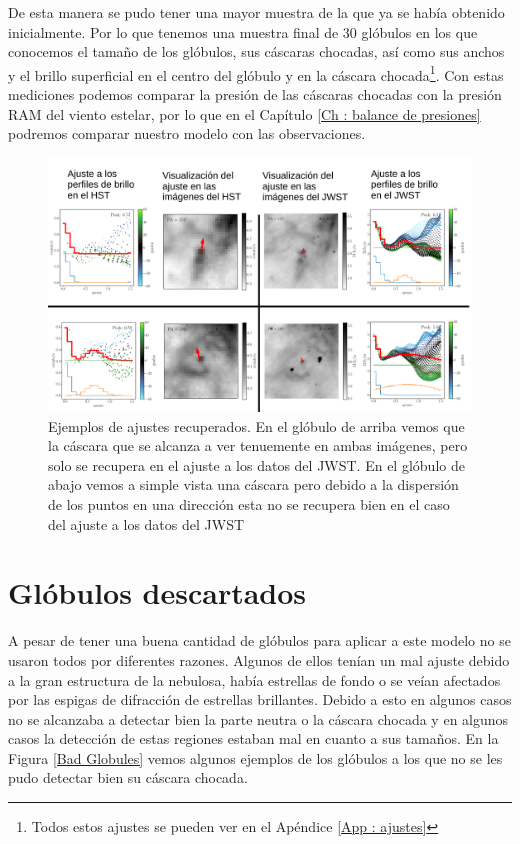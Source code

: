 \documentclass{book}
\begin{document}
De esta manera se pudo tener una mayor muestra de la que ya se había obtenido inicialmente. Por lo que tenemos una muestra final de 30 glóbulos en los que conocemos el tamaño de los glóbulos, sus cáscaras chocadas, así como  sus anchos y el brillo superficial en el centro del glóbulo y en la cáscara chocada\footnote{Todos estos ajustes se pueden ver en el Apéndice \ref{App : ajustes}}. Con estas mediciones podemos comparar la presión de las cáscaras chocadas con la presión RAM del viento estelar, por lo que en el Capítulo \ref{Ch : balance de presiones} podremos comparar nuestro modelo con las observaciones.

\begin{figure}[htb]
    \centering
    \includegraphics[width=\textwidth]{imagenes_corregidas/recuperados_aj.pdf}
    \caption{Ejemplos de ajustes recuperados. En el glóbulo de arriba vemos que la cáscara que se alcanza a ver tenuemente en ambas imágenes, pero solo se recupera en el ajuste a los datos del JWST. En el glóbulo de abajo vemos a simple vista una cáscara pero debido a la dispersión de los puntos en una dirección esta no se recupera bien en el caso del ajuste a los datos del JWST}
    \label{Recuperados Globulos}
\end{figure}

\section{Glóbulos descartados}\label{Bad globules}

A pesar de tener una buena cantidad de glóbulos para aplicar a este modelo no se usaron todos por diferentes razones. 
Algunos de ellos tenían un mal ajuste debido a la gran estructura de la nebulosa, había estrellas de fondo o se veían afectados por las espigas de difracción de estrellas brillantes.  Debido a esto en algunos casos no se alcanzaba a detectar bien la parte neutra o la cáscara chocada y en algunos casos la detección de estas regiones estaban mal en cuanto a sus tamaños. En la Figura \ref{Bad Globules} vemos algunos ejemplos de los glóbulos a los que no se les pudo detectar bien su cáscara chocada.\\
\end{document}
